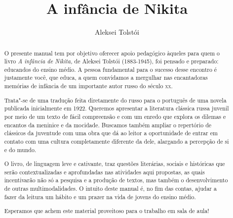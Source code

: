 \documentclass[11pt]{extarticle}
\begin{document}
\newcommand{\AutorLivro}{Aleksei Tolstói}
\newcommand{\TituloLivro}{A infância de Nikita}
\newcommand{\Tema}{Ficção, mistério e fantasia}
\newcommand{\Genero}{Romance}
\newcommand{\imagemCapa}{./images/PNLD0049-01.png}
\newcommand{\issnppub}{---}
\newcommand{\issnepub}{---}
\newcommand{\colaborador}{\textbf{Marina Darmaros} Marina Darmaros é jornalista e tradutora. Formada pela Cásper Líbero em Comunicação Social, tem mestrado em Jornalismo Internacional pela Universidade Russa da Amizade dos Povos (RUDN/Patrice Lumumba) e doutorado em Literatura e Cultura Russa pela Universidade de São Paulo.}


\title{\TituloLivro}
\author{\AutorLivro}
\def\authornotes{\colaborador}

\date{}
\maketitle



\begin{abstract}
O presente manual tem por objetivo oferecer apoio pedagógico àqueles
para quem o livro \emph{A infância de Nikita,} de Aleksei Tolstói
(1883-1945), foi pensado e preparado: educandos do ensino médio. A
pessoa fundamental para o sucesso desse encontro é justamente você, que
educa, a quem convidamos a mergulhar nas encantadoras memórias de
infância de um importante autor russo do século \textsc{xx}.

Trata"-se de uma tradução feita diretamente do russo para o português de
uma novela publicada inicialmente em 1922. Queremos apresentar a
literatura clássica russa juvenil por meio de um texto de fácil
compreensão e com um enredo que explora os dilemas e encantos da
meninice e da mocidade. Buscamos também ampliar o repertório de
clássicos da juventude com uma obra que dá ao leitor a oportunidade de
entrar em contato com uma cultura completamente diferente da dele,
alargando a percepção de si e do mundo.

O livro, de linguagem leve e cativante, traz questões literárias,
sociais e históricas que serão contextualizadas e aprofundadas nas
atividades aqui propostas, as quais incentivarão não só a pesquisa e a
produção de textos, mas também o desenvolvimento de outras
multimodalidades. O intuito deste manual é, no fim das contas, ajudar a
fazer da leitura um hábito e um prazer na vida de jovens do ensino
médio.

Esperamos que achem este material proveitoso para o trabalho em sala de
aula!

\end{abstract}
\end{document}
